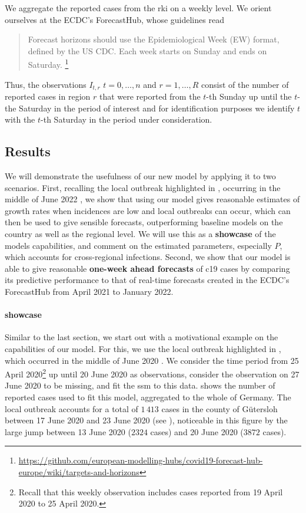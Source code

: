We aggregate the reported cases from the \acrshort{rki} on a weekly level. We orient ourselves at the ECDC's ForecastHub, whose guidelines read
\begin{quote}
    Forecast horizons should use the Epidemiological Week (EW) format, defined by the US CDC. Each week starts on Sunday and ends on Saturday. \footnote{\url{https://github.com/european-modelling-hubs/covid19-forecast-hub-europe/wiki/targets-and-horizons}}
\end{quote}
Thus, the observations $I_{t, r}$ $t=0, \dots, n$ and $r = 1, \dots, R$ consist of the number of reported cases in region $r$ that were reported from the $t$-th Sunday up until the $t$-the Saturday in the period of interest and for identification purposes we identify $t$ with the $t$-th Saturday in the period under consideration. 

\subsection{Results}
We will demonstrate the usefulness of our new model by applying it to two scenarios. First, recalling the local outbreak highlighted in , occurring in the middle of June 2022 \citep{Gunther2020SARSCoV2}, we show that using our model gives reasonable estimates of growth rates when incidences are low and local outbreaks can occur, which can then be used to give sensible forecasts, outperforming baseline models on the country as well as the regional level. We will use this as a \textbf{showcase} of the models capabilities, and comment on the estimated parameters, especially $P$, which accounts for cross-regional infections.
Second, we show that our model is able to give reasonable \textbf{one-week ahead forecasts} of \acrshort{c19} cases by comparing its predictive performance to that of real-time forecasts created in the ECDC's ForecastHub from April 2021 to January 2022.

\paragraph{showcase}
Similar to the last section, we start out with a motivational example on the capabilities of our model. For this, we use the local outbreak highlighted in , which occurred in the middle of June 2020 \citep{Gunther2020SARSCoV2}. We consider the time period from 25 April 2020\footnote{Recall that this weekly observation includes cases reported from 19 April 2020 to 25 April 2020.} up until 20 June 2020 as observations, consider the observation on 27 June 2020 to be missing, and fit the \acrshort{ssm} to this data.  shows the number of reported cases used to fit this model, aggregated to the whole of Germany. The local outbreak accounts for a total of $1\,413$ cases in the county of Gütersloh between 17 June 2020 and 23 June 2020 (see \citep[Figure 1]{Gunther2020SARSCoV2}), noticeable in this figure by the large jump between 13 June 2020 ($2324$ cases) and 20 June 2020 ($3872$ cases). 

